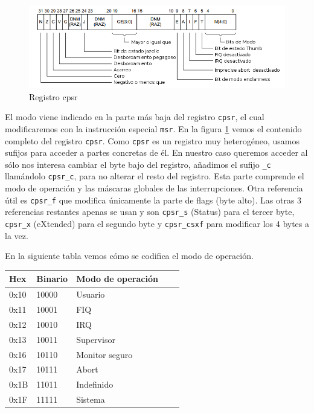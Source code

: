 \begin{figure}[h]
  \centering
    \includegraphics[width=14cm]{graphs/cpsr.png}
  \caption{Registro cpsr}
  \label{fig:cpsr}
\end{figure}

El modo viene indicado en la parte más baja del registro {\tt cpsr}, el cual modificaremos
con la instrucción especial {\tt msr}. En la figura \ref{fig:cpsr} vemos el contenido completo
del registro {\tt cpsr}. Como {\tt cpsr} es un registro muy heterogéneo, usamos
sufijos para acceder a partes concretas de él. En nuestro caso queremos acceder al sólo nos
interesa cambiar el byte bajo del registro, añadimos el sufijo {\tt \_c} llamándolo {\tt cpsr\_c},
para no alterar el resto del registro. Esta parte comprende el modo de operación
y las máscaras globales de las interrupciones. Otra referencia útil es {\tt cpsr\_f} que modifica
únicamente la parte de flags (byte alto). Las otras 3 referencias restantes apenas se usan y
son {\tt cpsr\_s} (Status) para el tercer byte, {\tt cpsr\_x} (eXtended) para el segundo byte y
{\tt cpsr\_csxf} para modificar los 4 bytes a la vez.

En la siguiente tabla vemos cómo se codifica el modo de operación.

\begin{longtable}{ p{1.8cm} | p{2cm} | p{5cm} | p{1cm} | p{1cm} }
\hline
{\bf Hex} & {\bf Binario} & {\bf Modo de operación} \\ \hline
0x10 & 10000 & Usuario        \\ \hline
0x11 & 10001 & FIQ            \\ \hline
0x12 & 10010 & IRQ            \\ \hline
0x13 & 10011 & Supervisor     \\ \hline
0x16 & 10110 & Monitor seguro \\ \hline
0x17 & 10111 & Abort          \\ \hline
0x1B & 11011 & Indefinido     \\ \hline
0x1F & 11111 & Sistema        \\ \hline
\end{longtable}

